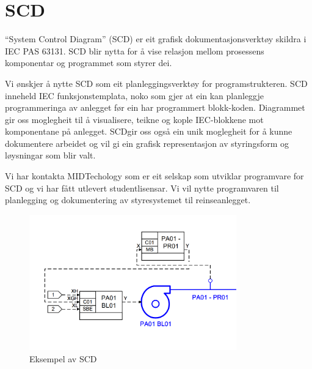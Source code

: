 \section{SCD}
\thispagestyle{fancy}


``System Control Diagram'' (\gls{SCD})  er eit grafisk dokumentasjonsverktøy skildra i \gls{IEC} \gls{PAS} 63131.\newline
 \gls{SCD} blir nytta for å vise relasjon mellom prosessens komponentar og programmet som styrer dei.
 
 Vi ønskjer å nytte \gls{SCD} som eit planleggingsverktøy for programstrukteren. \gls{SCD} inneheld \gls{IEC} funksjonstemplata, noko som gjer at ein kan
 planleggje programmeringa av anlegget før ein har programmert blokk-koden.
 Diagrammet gir oss moglegheit til å visualisere, teikne og kople \gls{IEC}-blokkene mot komponentane på anlegget.
 \gls{SCD}gir oss også ein unik moglegheit for å kunne dokumentere arbeidet og vil gi ein grafisk representasjon
 av styringsform og løysningar som blir valt.

 Vi har kontakta MIDTechology \citep{MIDT} som er eit selskap som utviklar programvare for \gls{SCD} og vi har fått utlevert studentlisensar. 
 Vi vil nytte programvaren til planlegging og dokumentering av styresystemet til reinseanlegget. \newline \newline \newline

 \begin{figure}[htbp]
    \centering
    \includegraphics[width=0.8\textwidth]{Bilder/Visio_eksempel.png}
    \caption{Eksempel av \gls{SCD}}\label{fig:SCD eksempel}    
\end{figure}

\newpage